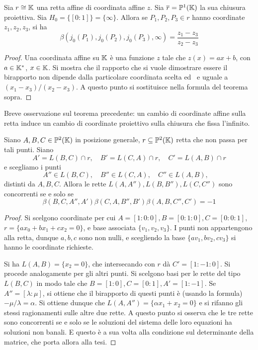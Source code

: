 \begin{cor}
    Sia $r\cong \mathbb{K}$ una retta affine di coordinata affine $z$. Sia
    $\overline{r}=\mathbb{P}^1(\mathbb{K})$ la sua chiusura proiettiva. Sia
    $H_0=\{[0:1]\}=\{\infty\}$. Allora se $P_1,P_2,P_3\in r$ hanno coordinate
    $z_1, z_2, z_3$, si ha
    \[
        \beta(j_0(P_1),j_0(P_2),j_0(P_3),\infty) = \frac{z_1-z_3}{z_2-z_3}
    \]
\end{cor}
\begin{proof}
    Una coordinata affine su $\mathbb{K}$ \`e una funzione $z$ tale che $z(x)=ax+b$, con
    $a\in\mathbb{K}^*$, $x\in\mathbb{K}$. Si mostra che il rapporto che si vuole dimostrare
    essere il birapporto non dipende dalla particolare coordinata scelta ed \
    e uguale a $(x_1-x_3)/(x_2-x_3)$. A questo punto si sostituisce nella
    formula del teorema sopra.
\end{proof}
Breve osservazione sul teorema precedente: un cambio di coordinate affine sulla
retta induce un cambio di coordinate proiettivo sulla chiusura che fissa
l'infinito. 

\begin{thm}
    Siano $A,B,C\in\mathbb{P}^2(\mathbb{K})$ in posizione generale, $r\subseteq \mathbb{P}^2(\mathbb{K})$ retta
    che non passa per tali punti. Siano
    \[
        A'= L(B,C)\cap r,\quad B'= L(C,A)\cap r,\quad C'=L(A,B)\cap r
    \]
    e scegliamo i punti
    \[
        A''\in L(B,C),\quad B''\in L(C,A),\quad C''\in L(A,B),\quad 
    \]
    distinti da $A,B,C$. Allora le rette $L(A,A''), L(B,B''), L(C,C'')$ sono
    concorrenti se e solo se
    \[
        \beta(B,C,A'',A')\beta(C,A,B'',B')\beta(A,B,C'',C')=-1
    \]
\end{thm}
\begin{proof}
    Si scelgono coordinate per cui $A=[1:0:0], B=[0:1:0], C=[0:0:1]$,
    $r=\{ax_0+bx_1+cx_2=0\}$, e base associata $\{v_1,v_2,v_3\}$. I punti non
    appartengono alla retta, dunque $a,b,c$ sono non nulli, e scegliendo la base
    $\{av_1,bv_2,cv_3\}$ si hanno le coordinate richieste.

    Si ha $L(A,B)=\{x_2=0\}$, che intersecando con $r$ d\`a $C'=[1:-1:0]$. Si
    procede analogamente per gli altri punti. Si scelgono basi per le rette del
    tipo $L(B,C)$ in modo tale che $B=[1:0], C=[0:1],A'=[1:-1]$. Se
    $A''=[\lambda:\mu]$, si ottiene che il birapporto di questi punti \`e
    (usando la formula) $-\mu/\lambda=\alpha$.
    Si ottiene dunque che $L(A,A'')=\{\alpha x_1+x_2=0\}$ e si rifanno gli
    stessi ragionamenti sulle altre due rette. A questo punto si osserva che le
    tre rette sono concorrenti se e solo se le soluzioni del sistema delle loro
    equazioni ha soluzioni non banali. E questo \`e a sua volta alla condizione
    sul determinante della matrice, che porta allora alla tesi.
\end{proof}


